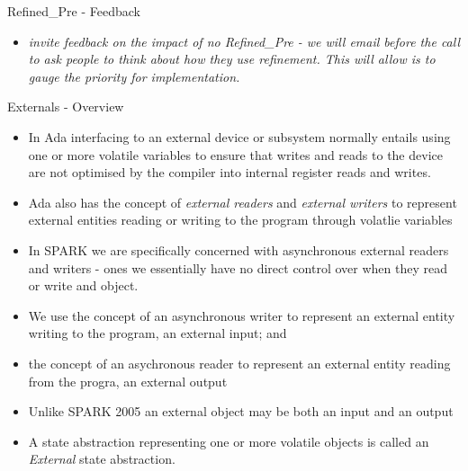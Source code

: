 \documentclass{beamer}
\begin{document}
\begin{frame}{Refined\_Pre - Feedback}

  \begin{itemize}
  \item \emph{invite feedback on the impact of no Refined\_Pre - we will email before the call to ask people to think about how they use refinement. This will allow is to gauge the priority for implementation.}
  \end{itemize}
 
\end{frame}

\begin{frame}{Externals - Overview}

  \begin{itemize}
  \item In Ada interfacing to an external device or subsystem normally
    entails using one or more volatile variables to ensure that writes
    and reads to the device are not optimised by the compiler into
    internal register reads and writes.
  \item Ada also has the concept of \emph {external readers} and \emph
    {external writers} to represent external entities reading or
    writing to the program through volatlie variables
 \item In SPARK we are specifically concerned with asynchronous
   external readers and writers - ones we essentially have no direct
   control over when they read or write and object.
  \item We use the concept of an asynchronous writer to represent an
    external entity writing to the program, an external input; and
 \item the concept of an asychronous reader to represent an external
   entity reading from the progra, an external output
 \item Unlike SPARK 2005 an external object may be both an input and
   an output
 \item A state abstraction representing one or more volatile objects
   is called an \emph {External} state abstraction.  
  \end{itemize}
 
\end{frame}
\end{document}
